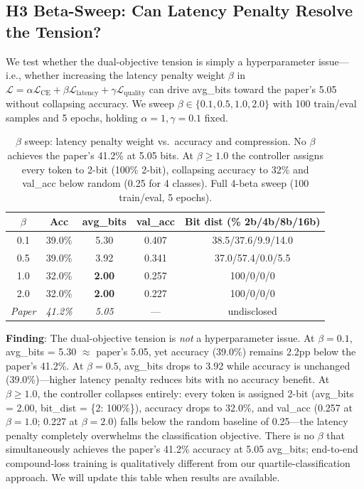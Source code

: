 \documentclass[10pt,twocolumn]{article}
\begin{document}
\subsection{H3 Beta-Sweep: Can Latency Penalty Resolve the Tension?}
\label{sec:beta_sweep}

We test whether the dual-objective tension is simply a hyperparameter
issue—i.e., whether increasing the latency penalty weight $\beta$ in
$\mathcal{L} = \alpha\mathcal{L}_\text{CE} + \beta\mathcal{L}_\text{latency} + \gamma\mathcal{L}_\text{quality}$
can drive avg\_bits toward the paper's 5.05 without collapsing accuracy.
We sweep $\beta \in \{0.1, 0.5, 1.0, 2.0\}$ with 100 train/eval samples
and 5 epochs, holding $\alpha=1, \gamma=0.1$ fixed.

\begin{table}[h]
\centering
\caption{$\beta$ sweep: latency penalty weight vs.\ accuracy and
compression. No $\beta$ achieves the paper's 41.2\% at 5.05 bits.
At $\beta \geq 1.0$ the controller assigns every token to 2-bit
(100\% 2-bit), collapsing accuracy to 32\% and val\_acc below random
(0.25 for 4 classes). Full 4-beta sweep (100 train/eval, 5 epochs).}
\label{tab:beta}
\footnotesize
\begin{tabular}{ccccc}
\toprule
$\beta$ & Acc & avg\_bits & val\_acc & Bit dist (\% 2b/4b/8b/16b) \\
\midrule
0.1 & 39.0\% & 5.30 & 0.407 & 38.5/37.6/9.9/14.0 \\
0.5 & 39.0\% & 3.92 & 0.341 & 37.0/57.4/0.0/5.5 \\
1.0 & 32.0\% & \textbf{2.00} & 0.257 & 100/0/0/0 \\
2.0 & 32.0\% & \textbf{2.00} & 0.227 & 100/0/0/0 \\
\midrule
\textit{Paper} & \textit{41.2\%} & \textit{5.05} & --- & undisclosed \\
\bottomrule
\end{tabular}
\end{table}

\textbf{Finding}: The dual-objective tension is \emph{not} a
hyperparameter issue.
At $\beta=0.1$, avg\_bits = 5.30 $\approx$ paper's 5.05, yet accuracy
(39.0\%) remains 2.2pp below the paper's 41.2\%.
At $\beta=0.5$, avg\_bits drops to 3.92 while accuracy is unchanged
(39.0\%)---higher latency penalty reduces bits with no accuracy benefit.
At $\beta \geq 1.0$, the controller collapses entirely: every token is
assigned 2-bit (avg\_bits = 2.00, bit\_dist = \{2: 100\%\}), accuracy
drops to 32.0\%, and val\_acc (0.257 at $\beta=1.0$; 0.227 at $\beta=2.0$)
falls below the random baseline of 0.25---the latency penalty completely
overwhelms the classification objective.
There is no $\beta$ that simultaneously achieves the paper's 41.2\%
accuracy at 5.05 avg\_bits; end-to-end compound-loss training is
qualitatively different from our quartile-classification approach.
We will update this table when results are available.
\end{document}

